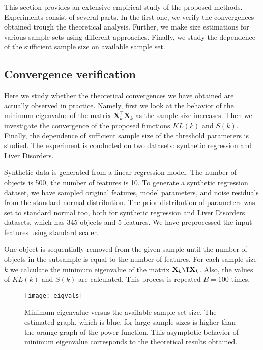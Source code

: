 \documentclass[sn-mathphys-num]{sn-jnl}%
\begin{document}
This section provides an extensive empirical study of the proposed methods. Experiments consist of several parts. In the first one, we verify the convergences obtained trough the theoretical analysis. Further, we make size estimations for various sample sets using different approaches. Finally, we study the dependence of the sufficient sample size on available sample set.

\subsection{Convergence verification}

Here we study whether the theoretical convergences we have obtained are actually observed in practice. Namely, first we look at the behavior of the minimum eigenvalue of the matrix $\mathbf{X}_k^\top \mathbf{X}_k$ as the sample size increases. Then we investigate the convergence of the proposed functions $KL(k)$ and $S(k)$. Finally, the dependence of sufficient sample size of the threshold parameters is studied. The experiment is conducted on two datasets: synthetic regression and Liver Disorders. 

Synthetic data is generated from a linear regression model. The number of objects is 500, the number of features is 10. To generate a synthetic regression dataset, we have sampled original features, model parameters, and noise residuals from the standard normal distribution. The prior distribution of parameters was set to standard normal too, both for synthetic regression and Liver Disorders datasets, which has 345 objects and 5 features.  We have preprocessed the input features using standard scaler.

One object is sequentially removed from the given sample until the number of objects in the subsample is equal to the number of features. For each sample size $k$ we calculate the minimum eigenvalue of the matrix $\mathbf{X}_k\T \mathbf{X}_k$. Also, the values of $KL(k)$ and $S(k)$ are calculated. This process is repeated $B=100$ times.

\begin{figure}[ht]
    \centering
    \texttt{[image: eigvals]}
    \caption{Minimum eigenvalue versus the available sample set size. The estimated graph, which is blue, for large sample sizes is higher than the orange graph of the power function. This asymptotic behavior of minimum eigenvalue corresponds to the theoretical results obtained.}
    \label{eigvals}
\end{figure}
\end{document}

